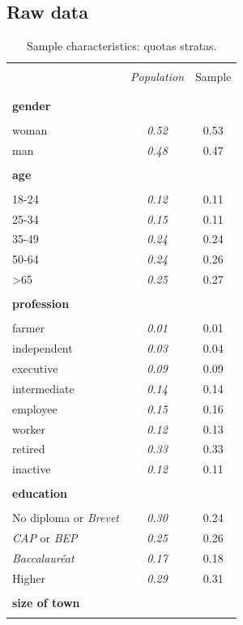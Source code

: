 \documentclass[english,5p,authoryear]{elsarticle}
\renewcommand*\thetable{\Roman{table}}
\begin{document}

\begin{appendices}
\renewcommand{\thetable}{\Alph{section}.\arabic{table}}

\section{Raw data\label{app:Raw-Data}}

\begin{table}[!htbp]
\label{table:sample_characteristics}
\caption{\label{tab:Sample-Characteristics}Sample characteristics: quotas stratas.}
\centering
\begin{tabular}{lcc}
\hline \hline  \\[-1.8ex]
 & \textit{Population} & Sample  \tabularnewline \\[-1.8ex]
\hline  \\[-1.8ex]
\textbf{gender} & & \tabularnewline  \\[-1.8ex]
woman & \textit{0.52} & 0.53\tabularnewline
man & \textit{0.48} & 0.47\tabularnewline
\hline \\[-1.8ex]
\textbf{age} &  & \tabularnewline  \\[-1.8ex]
18-24 & \textit{0.12} & 0.11\tabularnewline
25-34 & \textit{0.15} & 0.11\tabularnewline
35-49 & \textit{0.24} & 0.24\tabularnewline
50-64 & \textit{0.24} & 0.26\tabularnewline
>65 & \textit{0.25} & 0.27\tabularnewline
\hline \\[-1.8ex]
\textbf{profession} &  & \tabularnewline  \\[-1.8ex]
farmer & \textit{0.01} & 0.01\tabularnewline
independent & \textit{0.03} & 0.04\tabularnewline
executive & \textit{0.09} & 0.09\tabularnewline
intermediate & \textit{0.14} & 0.14\tabularnewline
employee & \textit{0.15} & 0.16\tabularnewline
worker & \textit{0.12} & 0.13\tabularnewline
retired & \textit{0.33} & 0.33\tabularnewline
inactive & \textit{0.12} & 0.11\tabularnewline
\hline  \\[-1.8ex]
\textbf{education} &  & \tabularnewline  \\[-1.8ex]
No diploma or \textit{Brevet} & \textit{0.30} & 0.24\tabularnewline
\textit{CAP} or \textit{BEP} & \textit{0.25} & 0.26\tabularnewline
\textit{Baccalauréat} & \textit{0.17} & 0.18\tabularnewline
Higher & \textit{0.29} & 0.31\tabularnewline
\hline  \\[-1.8ex]
\textbf{size of town} &  & \tabularnewline  \\[-1.8ex]

\end{tabular}
\end{table}
\end{appendices}
\end{document}
